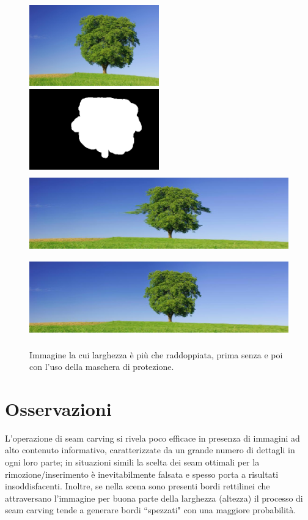 \documentclass[12pt,a4paper]{report}
\theoremstyle{plain}
\theoremstyle{definition}
\begin{document}
\begin{figure}[h]
\centering
\includegraphics[height=3.5cm]{tree}
\includegraphics[height=3.5cm]{treemask}
\vskip 0.1cm
\includegraphics[height=3.5cm]{treebad}
\vskip 0.1cm
\includegraphics[height=3.5cm]{treegood}
\caption{Immagine la cui larghezza è più che raddoppiata, prima senza e poi con l'uso della maschera di protezione.}
\label{preserve}
\end{figure}

\section*{Osservazioni}
L'operazione di seam carving si rivela poco efficace in presenza di immagini ad alto contenuto informativo, caratterizzate da un grande numero di dettagli in ogni loro parte; in situazioni simili la scelta dei seam ottimali per la rimozione/inserimento è inevitabilmente falsata e spesso porta a risultati insoddisfacenti. Inoltre, se nella scena sono presenti bordi rettilinei che attraversano l'immagine per buona parte della larghezza (altezza) il processo di seam carving tende a generare bordi ``spezzati" con una maggiore probabilità. 
\end{document}
